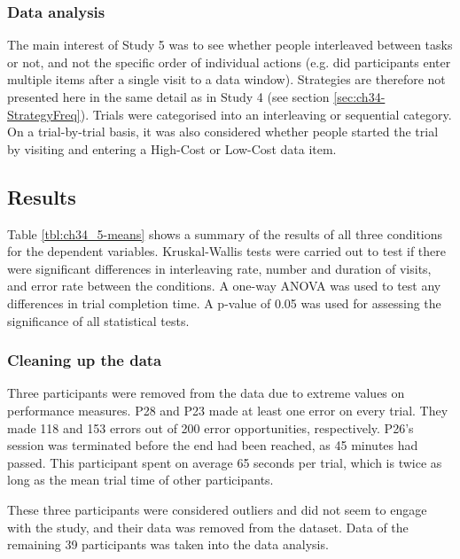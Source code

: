 \subsubsection{Data analysis}
The main interest of Study 5 was to see whether people interleaved between tasks or not, and not the specific order of individual actions (e.g. did participants enter multiple items after a single visit to a data window). Strategies are therefore not presented here in the same detail as in Study 4 (see section \ref{sec:ch34-StrategyFreq}). Trials were categorised into an interleaving or sequential category. On a trial-by-trial basis, it was also considered whether people started the trial by visiting and entering a High-Cost or Low-Cost data item.

\subsection{Results}
Table \ref{tbl:ch34_5-means} shows a summary of the results of all three conditions for the dependent variables. Kruskal-Wallis tests were carried out to test if there were significant differences in interleaving rate, number and duration of visits, and error rate between the conditions. A one-way ANOVA was used to test any differences in trial completion time. A p-value of 0.05 was used for assessing the significance of all statistical tests. 

\subsubsection{Cleaning up the data}
Three participants were removed from the data due to extreme values on performance measures.
P28 and P23 made at least one error on every trial. They made 118 and 153 errors out of 200 error opportunities, respectively. P26's session was terminated before the end had been reached, as 45 minutes had passed. This participant spent on average 65 seconds per trial, which is twice as long as the mean trial time of other participants.

These three participants were considered outliers and did not seem to engage with the study, and their data was removed from the dataset. Data of the remaining 39 participants was taken into the data analysis.

